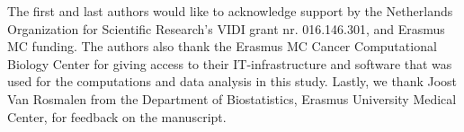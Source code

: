 
\begin{acks}
The first and last authors would like to acknowledge support by the Netherlands Organization for Scientific Research's VIDI grant nr. 016.146.301, and Erasmus MC funding. The authors also thank the Erasmus MC Cancer Computational Biology Center for giving access to their IT-infrastructure and software that was used for the computations and data analysis in this study. Lastly, we thank Joost Van Rosmalen from the Department of Biostatistics, Erasmus University Medical Center, for feedback on the manuscript.
\end{acks}